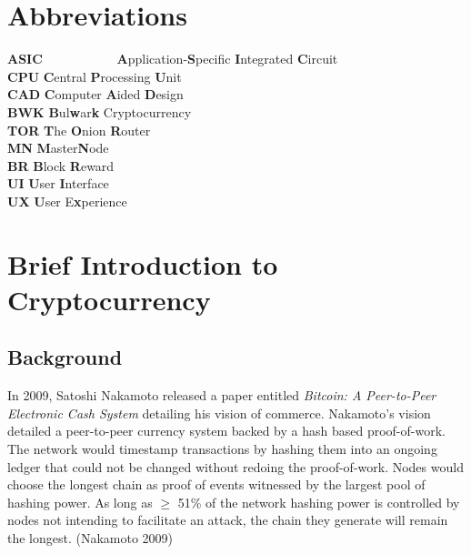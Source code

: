 \documentclass[11pt,a4paperpaper,]{report}
\begin{document}
\newpage


\tableofcontents

\newpage

\chapter*{Abbreviations}\label{abbreviations}

\begin{tabbing}
\textbf{ASIC}~~~~~~~~~~~    \= \textbf{A}pplication-\textbf{S}pecific \textbf{I}ntegrated \textbf{C}ircuit\\
\textbf{CPU}    \> \textbf{C}entral \textbf{P}rocessing \textbf{U}nit \\
\textbf{CAD}    \> \textbf{C}omputer \textbf{A}ided \textbf{D}esign \\
\textbf{BWK}    \> \textbf{B}ul\textbf{w}ar\textbf{k} Cryptocurrency \\
\textbf{TOR}    \> \textbf{T}he \textbf{O}nion \textbf{R}outer \\
\textbf{MN} \> \textbf{M}aster\textbf{N}ode \\
\textbf{BR} \> \textbf{B}lock \textbf{R}eward \\
\textbf{UI} \> \textbf{U}ser \textbf{I}nterface \\
\textbf{UX} \> \textbf{U}ser E\textbf{x}perience \\
\end{tabbing}

\newpage

\setcounter{page}{1} \renewcommand{\thepage}{\arabic{page}}

\chapter{Brief Introduction to
Cryptocurrency}\label{brief-introduction-to-cryptocurrency}

\section{Background}\label{background}

In 2009, Satoshi Nakamoto released a paper entitled
\textit{Bitcoin: A Peer-to-Peer Electronic Cash System} detailing his
vision of commerce. Nakamoto's vision detailed a peer-to-peer currency
system backed by a hash based proof-of-work. The network would timestamp
transactions by hashing them into an ongoing ledger that could not be
changed without redoing the proof-of-work. Nodes would choose the
longest chain as proof of events witnessed by the largest pool of
hashing power. As long as \(\geq\) 51\% of the network hashing power is
controlled by nodes not intending to facilitate an attack, the chain
they generate will remain the longest. (Nakamoto 2009)
\end{document}
